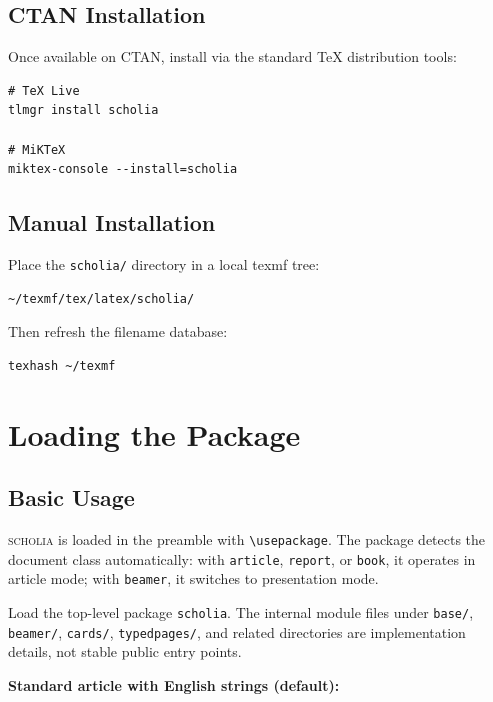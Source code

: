 \documentclass[11pt,a4paper]{article}
\newcommand{\cmd}[1]{\texttt{\textbackslash#1}}
\newcommand{\scholia}{\textsc{scholia}\xspace}
\begin{document}
\subsection{CTAN Installation}

Once available on CTAN, install via the standard TeX distribution tools:

\begin{lstlisting}
# TeX Live
tlmgr install scholia

# MiKTeX
miktex-console --install=scholia
\end{lstlisting}

\subsection{Manual Installation}

Place the \texttt{scholia/} directory in a local texmf tree:

\begin{lstlisting}
~/texmf/tex/latex/scholia/
\end{lstlisting}

Then refresh the filename database:

\begin{lstlisting}
texhash ~/texmf
\end{lstlisting}

\section{Loading the Package}

\subsection{Basic Usage}

\scholia is loaded in the preamble with \cmd{usepackage}. The package detects
the document class automatically: with \texttt{article}, \texttt{report}, or
\texttt{book}, it operates in article mode; with \texttt{beamer}, it switches
to presentation mode.

Load the top-level package \texttt{scholia}. The internal module files under
\texttt{base/}, \texttt{beamer/}, \texttt{cards/}, \texttt{typedpages/}, and
related directories are implementation details, not stable public entry points.

\medskip
\textbf{Standard article with English strings (default):}
\end{document}
